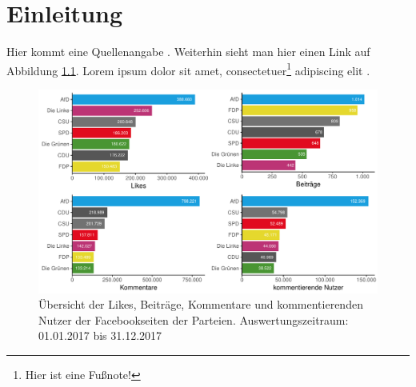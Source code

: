 \documentclass[12pt, twoside = false, bibliography=totoc]{scrbook}
\begin{document}


\frontmatter

\tableofcontents

\listoffigures
{}
\vspace*{24pt}
{\let\clearpage\relax \listoftables}	

\mainmatter

\chapter{Einleitung}\label{Einleitung}

Hier kommt eine Quellenangabe \parencite{bartlett_populism_2014}. Weiterhin sieht man hier einen Link auf Abbildung \ref{fig:Übersicht_Parteien_2013-17}. Lorem ipsum dolor sit amet, consectetuer\footnote{Hier ist eine Fußnote!} adipiscing elit \parencite[vgl.][]{bobba_age_2017}. 
\blindtext

\vspace*{4pt}
\begin{figure}[h]
	\centering
		\includegraphics[width=1.0\textwidth]{plots/overview_posts_user_2017}
	\caption[Übersicht der Likes, Anzahl der Beiträge, Kommentare und kommentierenden Nutzer auf den Facebookseiten der Parteien]{Übersicht der Likes, Beiträge, Kommentare und kommentierenden Nutzer der Facebookseiten der Parteien. Auswertungszeitraum: 01.01.2017 bis 31.12.2017}
	\label{fig:Übersicht_Parteien_2013-17}
\end{figure}
\end{document}
